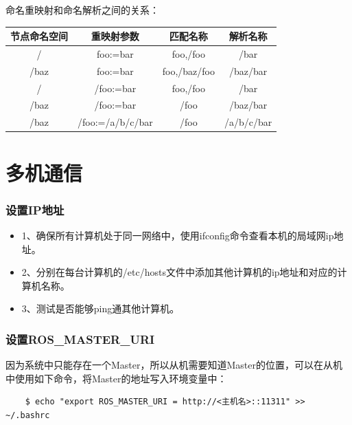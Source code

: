 \documentclass[9pt, oneside]{book}
\begin{document}
命名重映射和命名解析之间的关系：

\begin{table}[H]
    \centering
    \begin{tabular}{c|c|c|c}
    \hline
    节点命名空间 & 重映射参数            & 匹配名称         & 解析名称       \\ \hline
    /      & foo:=bar         & foo,/foo     & /bar       \\ \hline
    /baz   & foo:=bar         & foo,/baz/foo & /baz/bar   \\ \hline
    /      & /foo:=bar        & foo,/foo     & /bar       \\ \hline
    /baz   & /foo:=bar        & /foo         & /baz/bar   \\ \hline
    /baz   & /foo:=/a/b/c/bar & /foo         & /a/b/c/bar \\ \hline
    \end{tabular}
\end{table}

\section{多机通信}

\subsubsection{设置IP地址}

\begin{itemize}
    \item 1、确保所有计算机处于同一网络中，使用ifconfig命令查看本机的局域网ip地址。
    \item 2、分别在每台计算机的/etc/hosts文件中添加其他计算机的ip地址和对应的计算机名称。
    \item 3、测试是否能够ping通其他计算机。
\end{itemize}

\subsubsection{设置ROS\_MASTER\_URI}

因为系统中只能存在一个Master，所以从机需要知道Master的位置，可以在从机中使用如下命令，将Master的地址写入环境变量中：

\begin{verbatim}
    $ echo "export ROS_MASTER_URI = http://<主机名>::11311" >> ~/.bashrc
\end{verbatim}
\end{document}
